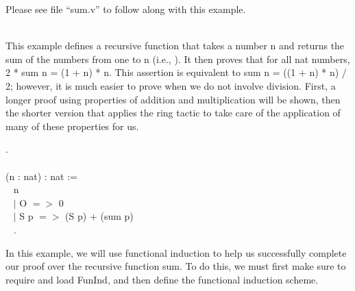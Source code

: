
Please see file ``sum.v'' to follow along with this example. 

~\\
This example defines a recursive function that takes a number n and returns the sum of the numbers from one to n (i.e., ).
It then proves that for all nat numbers, 2 * sum n = (1 + n) * n.
This assertion is equivalent to sum n = ((1 + n) * n) / 2; 
however, it is much easier to prove when we do not involve division.
First, a longer proof using properties of addition and multiplication will be shown, 
then the shorter version that applies the ring tactic to take care of the application of many of these properties for us.

\begin{code}
	\Load {}.
	\\ \\
	\Fixpoint {} (n : nat) : nat := 		\\ \-\ \quad
	\match n \with						\\ \-\ \quad
	$\mid$ O $=>$ 0					\\ \-\ \quad
	$\mid$ S p $=>$ (S p) + (sum p)		\\ \-\ \quad
	\End.
\end{code}

\noindent
In this example, we will use functional induction to help us successfully complete our proof over the recursive function sum.
To do this, we must first make sure to require and load FunInd, and then define the functional induction scheme.





